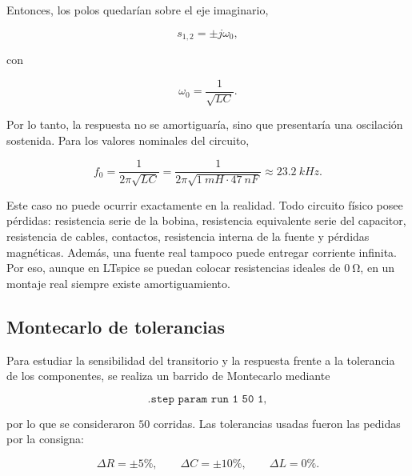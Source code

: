 Entonces, los polos quedarían sobre el eje imaginario,

\begin{equation}
    s_{1,2}=\pm j\omega_0,
\end{equation}

con

\begin{equation}
    \omega_0=\frac{1}{\sqrt{LC}}.
\end{equation}

Por lo tanto, la respuesta no se amortiguaría, sino que presentaría una oscilación sostenida. Para los valores nominales del circuito,

\begin{equation}
    f_0=\frac{1}{2\pi\sqrt{LC}}
    =\frac{1}{2\pi\sqrt{\SI{1}{mH}\cdot\SI{47}{nF}}}
    \approx \SI{23.2}{kHz}.
\end{equation}

Este caso no puede ocurrir exactamente en la realidad. Todo circuito físico posee pérdidas: resistencia serie de la bobina, resistencia equivalente serie del capacitor, resistencia de cables, contactos, resistencia interna de la fuente y pérdidas magnéticas. Además, una fuente real tampoco puede entregar corriente infinita. Por eso, aunque en LTspice se puedan colocar resistencias ideales de $\SI{0}{\ohm}$, en un montaje real siempre existe amortiguamiento.

\subsection{Montecarlo de tolerancias}

Para estudiar la sensibilidad del transitorio y la respuesta frente a la tolerancia de los componentes, se realiza un barrido de Montecarlo mediante

\begin{equation}
    \texttt{.step param run 1 50 1},
\end{equation}

por lo que se consideraron $50$ corridas. Las tolerancias usadas fueron las pedidas por la consigna:

\begin{equation}
    \Delta R = \pm 5\%,
    \qquad
    \Delta C = \pm 10\%,
    \qquad
    \Delta L = 0\%.
\end{equation}



